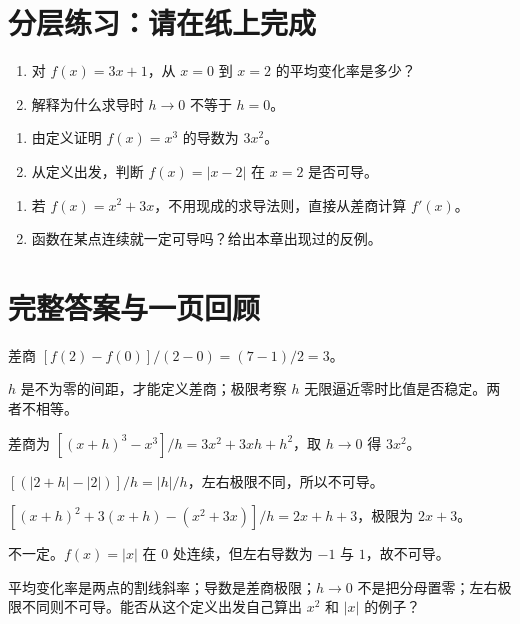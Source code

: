 \documentclass[12pt,a4paper,UTF8,fontset=none]{ctexart}
\begin{document}
\section{分层练习：请在纸上完成}
\begin{enumerate}[label=\textbf{A\arabic*.}]
\item 对 $f(x)=3x+1$，从 $x=0$ 到 $x=2$ 的平均变化率是多少？
\item 解释为什么求导时 $h\to0$ 不等于 $h=0$。
\end{enumerate}
\begin{enumerate}[label=\textbf{B\arabic*.}]
\item 由定义证明 $f(x)=x^3$ 的导数为 $3x^2$。
\item 从定义出发，判断 $f(x)=|x-2|$ 在 $x=2$ 是否可导。
\end{enumerate}
\begin{enumerate}[label=\textbf{C\arabic*.}]
\item 若 $f(x)=x^2+3x$，不用现成的求导法则，直接从差商计算 $f'(x)$。
\item 函数在某点连续就一定可导吗？给出本章出现过的反例。
\end{enumerate}

\section{完整答案与一页回顾}
 差商 $[f(2)-f(0)]/(2-0)=(7-1)/2=3$。

 $h$ 是不为零的间距，才能定义差商；极限考察 $h$ 无限逼近零时比值是否稳定。两者不相等。

 差商为 $[(x+h)^3-x^3]/h=3x^2+3xh+h^2$，取 $h\to0$ 得 $3x^2$。

 $[(|2+h|-|2|)]/h=|h|/h$，左右极限不同，所以不可导。

 $[(x+h)^2+3(x+h)-(x^2+3x)]/h=2x+h+3$，极限为 $2x+3$。

 不一定。$f(x)=|x|$ 在 $0$ 处连续，但左右导数为 $-1$ 与 $1$，故不可导。

\begin{takeawaybox}[闭上书复述]
平均变化率是两点的割线斜率；导数是差商极限；$h\to0$ 不是把分母置零；左右极限不同则不可导。能否从这个定义出发自己算出 $x^2$ 和 $|x|$ 的例子？
\end{takeawaybox}
\end{document}
